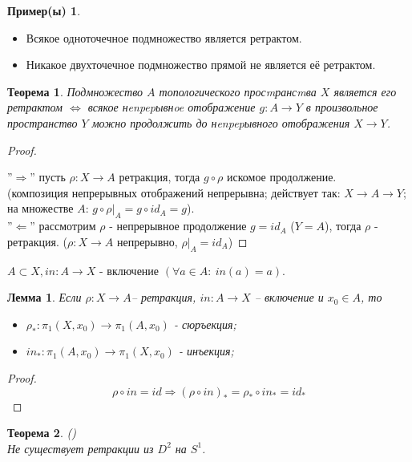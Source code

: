 \documentclass[a4paper]{article}
\theoremstyle{indented}
\newtheorem{theorem}{Теорема}
\newtheorem{lemma}{Лемма}
\theoremstyle{definition}
\newtheorem*{exl}{Пример(ы)}
\theoremstyle{remark}
\DeclareMathOperator{\La}{\Leftarrow}
\DeclareMathOperator{\Ra}{\Rightarrow}
\DeclareMathOperator{\Llra}{\Longleftrightarrow}
\begin{document}
\begin{exl}\
    
    \begin{itemize}
        \item Всякое одноточечное подмножество является ретрактом.
        \item Никакое двухточечное подмножество прямой не является её ретрактом.
    \end{itemize}
\end{exl}



\begin{theorem}
    Подмножество $A$ топологического просmрансmва $X$ является его 
    ретрактом $\Llra$ всякое нenpepывнoe отображение $g : A \to Y$ в 
    произвольное пространство $Y$ можно продолжить до нenpepывного
    отображения $X \to Y$.
\end{theorem}

\begin{proof}\
    
    \noindent
    ''$\Ra$'' пусть $\rho: X \to A$ ретракция, тогда $g\circ\rho$ искомое продолжение. \\
    (композиция непрерывных отображений непрерывна; действует так: $X\to A \to Y$; на множестве $A$: $g\circ\rho|_A = g\circ id_A = g$).\\
    ''$\La$'' рассмотрим $\rho$ - непрерывное продолжение $g=id_A$ ($Y=A$), тогда $\rho$ - ретракция. ($\rho: X \to A$ непрерывно, $\rho|_A = id_A$)  
\end{proof}

$A \subset X, in: A \to X$ - включение $(\forall a \in A:\ in(a)=a)$.
\begin{lemma}
    Если $\rho: X \to A$– ретракция, $in: A \to X$ – включение и $x_0 \in A$, то
    \begin{itemize}
        \item $\rho_*: \pi_1(X,x_0) \to \pi_1(A,x_0)$ - сюръекция;
        \item $in_*: \pi_1(A,x_0) \to \pi_1(X,x_0)$ - инъекция;
    \end{itemize}
\end{lemma}

\begin{proof}
   $$ \rho \circ in = id \Ra (\rho \circ in)_* = \rho_* \circ in_* = id_*$$
\end{proof}

\begin{theorem}
    () \\
    Не существует ретракции из $D^2$ на $S^1$.
\end{theorem}
\end{document}
